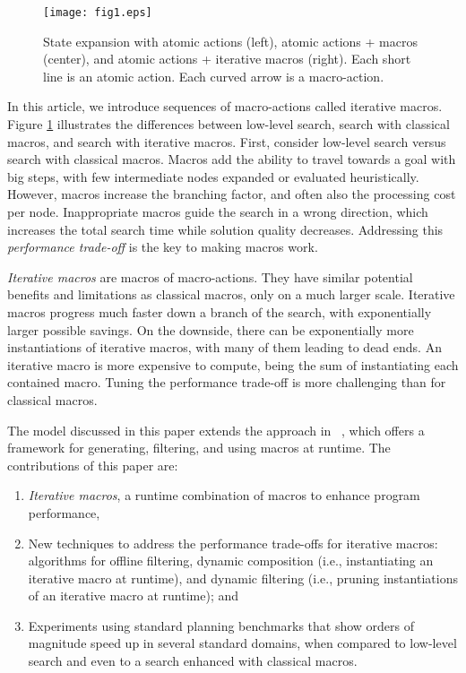 \documentclass{article}
\begin{document}
\begin{figure}
\begin{center}
\texttt{[image: fig1.eps]}
\caption{State expansion with atomic actions (left), atomic actions + macros (center),
and atomic actions + iterative macros (right). Each short line is an atomic action.
Each curved arrow is a macro-action.}
\label{fig1}
\end{center}
\end{figure}

In this article, we introduce sequences of macro-actions called iterative macros.
Figure \ref{fig1} illustrates the differences between low-level search,
search with classical macros, and search with iterative macros. 
First, consider low-level search versus search with classical macros.
Macros add the ability to travel towards a goal with big steps,
with few intermediate nodes expanded or evaluated heuristically.
However, macros increase the branching factor, and often also
the processing cost per node.
Inappropriate macros guide the search in a wrong direction,
which increases the total search time while solution quality decreases.
Addressing this \emph{performance trade-off} 
is the key to making macros work.

\emph{Iterative macros} are macros of macro-actions.
They have similar potential benefits and limitations as classical macros,
only on a much larger scale.
Iterative macros progress much faster down a branch of the search,
with exponentially larger possible savings.
On the downside, there can be exponentially more instantiations of
iterative macros, with many of them leading to dead ends.
An iterative macro is more expensive to compute, being the sum 
of instantiating each contained macro.
Tuning the performance trade-off 
is more challenging than for classical macros.

The model discussed in this paper extends the approach in 
\citeauthor{Botea:05}~\citeyear{Botea:05}, which offers
a framework for generating, filtering, and using macros at runtime.
The contributions of this paper are:
\begin{enumerate}
\item
\emph{Iterative macros}, a runtime combination of macros to enhance program performance,
\item
New techniques to address the performance trade-offs for iterative macros:
algorithms for offline filtering, 
dynamic composition (i.e., instantiating an iterative macro at runtime),
and dynamic filtering (i.e., pruning instantiations of an iterative macro at runtime);
and
\item
Experiments using standard planning benchmarks 
that show orders of magnitude speed up in several standard domains,
when compared to low-level search and even to a search enhanced with classical macros.
\end{enumerate}
\end{document}
